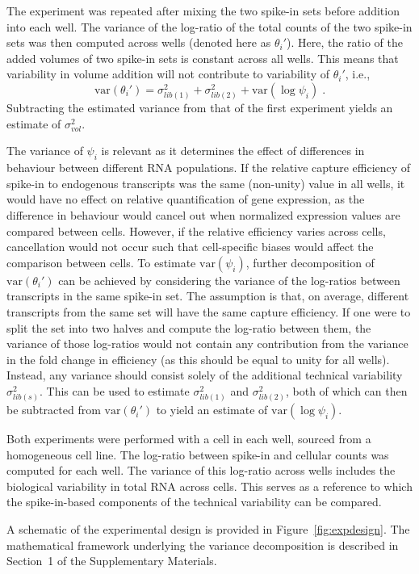 \documentclass{article}
\begin{document}
The experiment was repeated after mixing the two spike-in sets before addition into each well. 
The variance of the log-ratio of the total counts of the two spike-in sets was then computed across wells (denoted here as $\theta_i'$).
Here, the ratio of the added volumes of two spike-in sets is constant across all wells.
This means that variability in volume addition will not contribute to variability of $\theta_i'$, i.e.,
\[
    \mbox{var}(\theta_i') = \sigma^2_{lib(1)} + \sigma^2_{lib(2)} + \mbox{var}(\log \psi_i) \;.
\]
Subtracting the estimated variance from that of the first experiment yields an estimate of $\sigma_{vol}^2$.

The variance of $\psi_i$ is relevant as it determines the effect of differences in behaviour between different RNA populations.
If the relative capture efficiency of spike-in to endogenous transcripts was the same (non-unity) value in all wells, it would have no effect on relative quantification of gene expression, as the difference in behaviour would cancel out when normalized expression values are compared between cells.
However, if the relative efficiency varies across cells, cancellation would not occur such that cell-specific biases would affect the comparison between cells.
To estimate $\mbox{var}(\psi_i)$, further decomposition of $\mbox{var}(\theta_i')$ can be achieved by considering the variance of the log-ratios between transcripts in the same spike-in set.
The assumption is that, on average, different transcripts from the same set will have the same capture efficiency.
If one were to split the set into two halves and compute the log-ratio between them, the variance of those log-ratios would not contain any contribution from the variance in the fold change in efficiency (as this should be equal to unity for all wells).
Instead, any variance should consist solely of the additional technical variability $\sigma^2_{lib(s)}$.
This can be used to estimate $ \sigma^2_{lib(1)}$ and $\sigma^2_{lib(2)}$, both of which can then be subtracted from $\mbox{var}(\theta_i')$ to yield an estimate of $\mbox{var}(\log \psi_i)$.

Both experiments were performed with a cell in each well, sourced from a homogeneous cell line.
The log-ratio between spike-in and cellular counts was computed for each well.
The variance of this log-ratio across wells includes the biological variability in total RNA across cells.
This serves as a reference to which the spike-in-based components of the technical variability can be compared. 

A schematic of the experimental design is provided in Figure~\ref{fig:expdesign}.
The mathematical framework underlying the variance decomposition is described in Section~1 of the Supplementary Materials.
\end{document}
